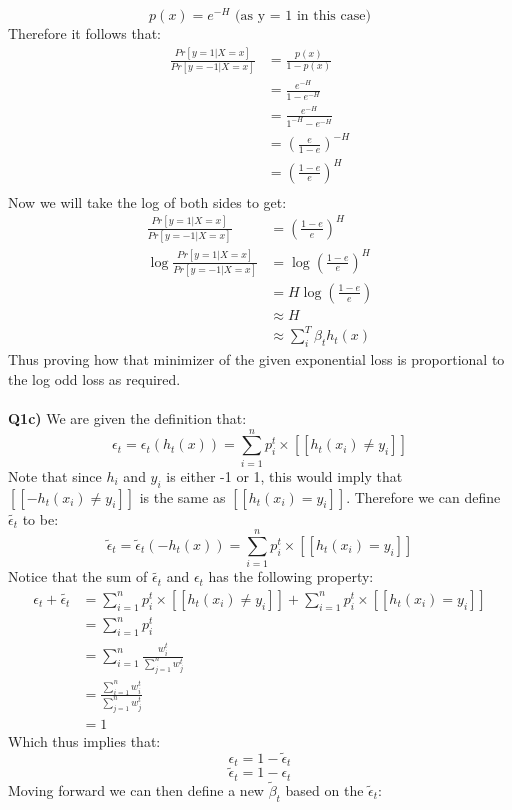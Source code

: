 \documentclass{article}
\begin{document}
\begin{titlepage}
\[ p(x) = e^{-H} \text{ (as y = 1 in this case)}  \]
Therefore it follows that:
\begin{align*}
\frac{Pr[ y = 1 | X = x ]}{Pr[ y = -1 | X = x ]} &= \frac{p(x)}{1-p(x)} \\
&= \frac{e^{-H}}{1-e^{-H}} \\
&= \frac{e^{-H}}{1^{-H}-e^{-H}} \\
&= (\frac{e}{1-e})^{-H} \\
&= (\frac{1-e}{e})^{H} \\
\end{align*}
Now we will take the log of both sides to get:
\begin{align*}
\frac{Pr[ y = 1 | X = x ]}{Pr[ y = -1 | X = x ]} &= (\frac{1-e}{e})^{H} \\
\log\frac{Pr[ y = 1 | X = x ]}{Pr[ y = -1 | X = x ]} &= \log(\frac{1-e}{e})^{H} \\
&=  H \log(\frac{1-e}{e}) \\
&\approx H \\
&\approx \sum_i^T \beta_th_t(x)
\end{align*}
Thus proving how that minimizer of the given exponential loss is proportional to the log odd loss as required.\\\\
\textbf{Q1c)} We are given the definition that:
\[ \epsilon_t = \epsilon_t(h_t(x)) = \sum_{i=1}^n p^t_i \times [[h_t(x_i) \neq y_i ]]  \]
Note that since $h_i$ and $y_i$ is either -1 or 1, this would imply that $[[-h_t(x_i) \neq y_i ]]$ is the same as $[[h_t(x_i) = y_i ]]$. Therefore we can define $\widetilde{\epsilon_t}$ to be:
\[ \widetilde{\epsilon}_t = \widetilde{\epsilon}_t(-h_t(x)) = \sum_{i=1}^n p^t_i \times [[h_t(x_i) = y_i ]] \]
Notice that the sum of $\widetilde{\epsilon_t}$ and $\epsilon_t$ has the following property:
\begin{align*}
\epsilon_t + \widetilde{\epsilon_t} &= \sum_{i=1}^n p^t_i \times [[h_t(x_i) \neq y_i ]] + \sum_{i=1}^n p^t_i \times [[h_t(x_i) = y_i ]] \\
&= \sum_{i=1}^n p^t_i \\
&= \sum_{i=1}^n \frac{w_i^t}{\sum_{j=1}^n w_j^t}\\
&= \frac{\sum_{i=1}^nw_i^t}{\sum_{j=1}^n w_j^t} \\
&= 1
\end{align*}
Which thus implies that:
\[ \epsilon_t = 1 - \widetilde{\epsilon}_t \]
\[ \widetilde{\epsilon}_t = 1 - \epsilon_t \]
\newpage
Moving forward we can then define a new $\widetilde{\beta}_t$ based on the $\widetilde{\epsilon}_t$:

\end{titlepage}
\end{document}
